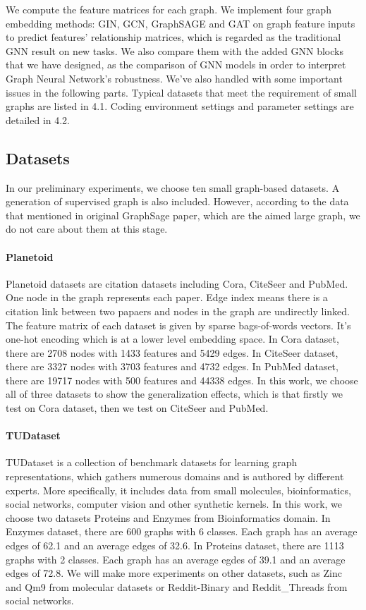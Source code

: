 \documentclass[sigconf]{acmart}
\begin{document}
We compute the feature matrices for each graph. We implement four graph embedding methods: GIN, GCN, GraphSAGE and GAT on graph feature inputs to predict features' relationship matrices, which is regarded as the traditional GNN result on new tasks. We also compare them with the added GNN blocks that we have designed, as the comparison of GNN models in order to interpret Graph Neural Network's robustness. We've also handled with some important issues in the following parts. Typical datasets that meet the requirement of small graphs are listed in 4.1. Coding environment settings and parameter settings are detailed in 4.2. 

\subsection{Datasets}
In our preliminary experiments, we choose ten small graph-based datasets. A generation of supervised graph is also included. However, according to the data that mentioned in original GraphSage
paper, which are the aimed large graph, we do not care about them at this stage.
\paragraph{Planetoid}
Planetoid datasets are citation datasets including {\sc Cora}, {\sc CiteSeer} and {\sc PubMed}. One node in the graph represents each paper. Edge index means there is a citation link between two papaers and nodes in the graph are undirectly linked. The feature matrix of each dataset is given by sparse bags-of-words vectors. It's one-hot encoding which is at a lower level embedding space. In  {\sc Cora} dataset, there are 2708 nodes with 1433 features and 5429 edges. In {\sc CiteSeer} dataset, there are 3327 nodes with 3703 features and 4732 edges. In {\sc PubMed} dataset, there are 19717 nodes with 500 features and 44338 edges. In this work, we choose all of three datasets to show the generalization effects, which is that firstly we test on {\sc Cora} dataset, then we test on {\sc CiteSeer} and {\sc PubMed}.

\paragraph{TUDataset}
TUDataset is a collection of benchmark datasets for learning graph representations, which gathers numerous domains and is authored by different experts. More specifically, it includes data from small molecules, bioinformatics, social networks, computer vision and other synthetic kernels. In this work, we choose two datasets  {\sc Proteins} and {\sc Enzymes} from Bioinformatics domain. In {\sc Enzymes} dataset, there are 600 graphs with 6 classes. Each graph has an average edges of 62.1 and an average edges of 32.6. In {\sc Proteins} dataset, there are 1113 graphs with 2 classes. Each graph has an average egdes of 39.1 and an average edges of 72.8. We will make more experiments on other datasets, such as {\sc Zinc} and {\sc Qm9} from molecular datasets or {\sc Reddit-Binary} and {\sc Reddit\_Threads} from social networks. 
\end{document}
